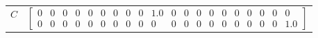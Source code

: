 \begin{tabular}{cl}
   $C$    & $\left[\begin{array}{cccccccccccccccccccc}0 & 0 & 0 & 0 & 0 & 0 & 0 & 0 & 0 & 1.0 & 0 & 0 & 0 & 0 & 0 & 0 & 0 & 0 & 0 & 0\\0 & 0 & 0 & 0 & 0 & 0 & 0 & 0 & 0 & 0 & 0 & 0 & 0 & 0 & 0 & 0 & 0 & 0 & 0 & 1.0\end{array}\right]$                                                                                                                                                                                                                                                                                                                                                                                                                                                                                                                                                                                                                                                                                                                                                                                                                                                                                                                                                                                                                                                                                                                                                                                                                                                                                                                                                                                                                                                                                                                                                                                                                                                                                                                                                                                                                                                                                                                                                                                                                                                                                                                                                                                                                                                                                                                                                                                                                                                                                                                                                                                                                                                                                                                                                                                                                                                                                                                                                                                                                                                                           
\end{tabular}
